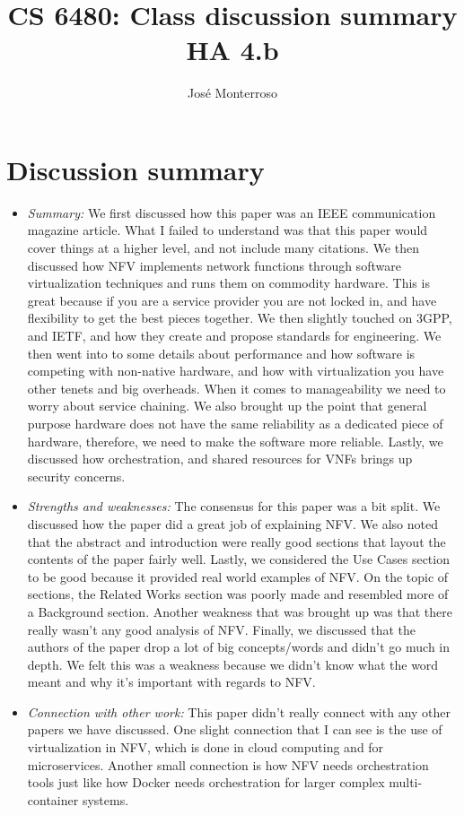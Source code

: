 \documentclass[letterpaper,twocolumn,10pt]{article}
\title{CS 6480: Class discussion summary\\
HA 4.b\\}
\author{José Monterroso}
\affil{School of Computing, University of Utah}
\begin{document}
\maketitle
\section*{Discussion summary}
\begin{itemize}

\item {\it Summary:} 
We first discussed how this paper was an IEEE communication magazine article. What I failed to 
understand was that this paper would cover things at a higher level, and not include many citations. 
We then discussed how NFV implements network functions through software virtualization techniques
and runs them on commodity hardware. This is great because if you are a service provider you are 
not locked in, and have flexibility to get the best pieces together. We then slightly touched
on 3GPP, and IETF, and how they create and propose standards for engineering. We then went into to some details about 
performance and how software is competing with non-native hardware, and how with virtualization
you have other tenets and big overheads. When it comes to manageability we need to worry about 
service chaining. We also brought up the point that general purpose hardware does not have the same
reliability as a dedicated piece of hardware, therefore, we need to make the software more reliable. Lastly,
we discussed how orchestration, and shared resources for VNFs brings up security concerns. 


\item {\it Strengths and weaknesses:} 
The consensus for this paper was a bit split. We discussed how the paper did a great job of explaining NFV. We 
also noted that the abstract and introduction were really good sections that layout the contents of
the paper fairly well.  Lastly, we considered the Use Cases section to be 
good because it provided real world examples of NFV. On the topic of sections, the Related Works
section was poorly made and resembled more of a Background section. Another weakness that 
was brought up was that there really wasn't any good analysis of NFV. Finally, we discussed that 
the authors of the paper drop a lot of big concepts/words and didn't go much in depth. We felt this 
was a weakness because we didn't know what the word meant and why it's important with regards 
to NFV.

\item {\it Connection with other work:} 
This paper didn't really connect with any other papers we have discussed. One slight connection
that I can see is the use of virtualization in NFV, which is done in cloud computing and for microservices. 
Another small connection is how NFV needs orchestration tools just like how Docker needs orchestration
for larger complex multi-container systems. 


\end{itemize}
\end{document}
